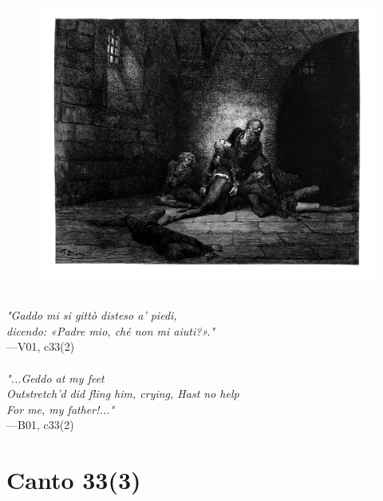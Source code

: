\documentclass[../Dore_vision.tex]{subfiles}
\begin{document}
\begin{figure}[ht]
\centering
\includegraphics[height=\figsize]{illustrations/book_1/V01, c33(2).jpg}
\end{figure}

\begin{center}
\begin{minipage}{0.8\linewidth}
\textit{\\
"Gaddo mi si gittò disteso a’ piedi,\\dicendo: «Padre mio, ché non mi aiuti?»."} \\
—V01, c33(2) \\~\\
\textit{"...Geddo at my feet\\Outstretch'd did fling him, crying, \textquotesingle Hast no help\\For me, my father!\textquotesingle..."} \\
—B01, c33(2)
\end{minipage}
\end{center}

\newpage

\section{Canto 33(3)}
\end{document}

